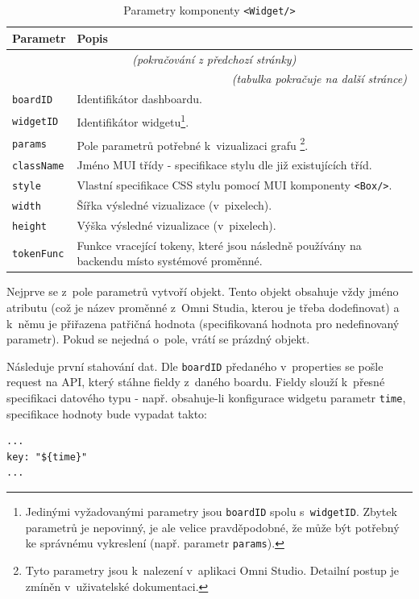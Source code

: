 \documentclass[czech, bc, kiv, he, iso690numb, viewonly]{fasthesis} %
\begin{document}
	\begin{longtable}{p{}p{}}
	\caption{Parametry komponenty \texttt{<Widget/>}}
	\label{tab:widgetProps}\\
	\toprule[1.5pt]
	\textbf{Parametr} & \textbf{Popis}\\
	\midrule
	\endfirsthead
	\multicolumn{2}{c}{\tablename{}~\thetable{} \textit{(pokračování z předchozí stránky)}}\\
	\endhead
	\midrule
	\multicolumn{2}{r}{\textit{(tabulka pokračuje na další stránce)}}\\
	\endfoot
	\bottomrule[1.5pt]
	\endlastfoot
	\verb"boardID" & Identifikátor dashboardu.  \\
	\midrule
	\verb"widgetID" & Identifikátor widgetu\footnote{Jedinými vyžadovanými parametry jsou \texttt{boardID} spolu s~\texttt{widgetID}. Zbytek parametrů je nepovinný, je ale velice pravděpodobné, že může být potřebný ke správnému vykreslení (např. parametr \texttt{params}).}. \\
	\midrule
	\verb"params" & Pole parametrů potřebné k~vizualizaci grafu \footnote{Tyto parametry jsou k~nalezení v~aplikaci Omni Studio. Detailní postup je zmíněn v~uživatelské dokumentaci.}. \\
	\midrule
	\verb"className" & Jméno MUI třídy - specifikace stylu dle již existujících tříd. \\
	\midrule
	\verb"style" & Vlastní specifikace CSS stylu pomocí MUI komponenty \texttt{<Box/>}. \\
	\midrule
	\verb"width" & Šířka výsledné vizualizace (v~pixelech). \\
	\midrule
	\verb"height" & Výška výsledné vizualizace (v~pixelech). \\
	\midrule
	\verb"tokenFunc" & Funkce vracející tokeny, které jsou následně používány na backendu místo systémové proměnné. \\
	\end{longtable}

Nejprve se z~pole parametrů vytvoří objekt. Tento objekt obsahuje vždy jméno atributu (což je název proměnné z~Omni Studia, kterou je třeba dodefinovat) a k~němu je přiřazena patřičná hodnota (specifikovaná
hodnota pro nedefinovaný parametr). Pokud se nejedná o~pole, vrátí se prázdný objekt.

Následuje první stahování dat. Dle \texttt{boardID} předaného v~properties se pošle request na API, který stáhne fieldy z~daného boardu. Fieldy slouží k~přesné specifikaci datového typu - např.
obsahuje-li konfigurace widgetu parametr \texttt{time}, specifikace hodnoty bude vypadat takto:
\lstset{style=plainsrc}
\begin{lstlisting}
...
key: "${time}"
...
\end{lstlisting}
\end{document}
